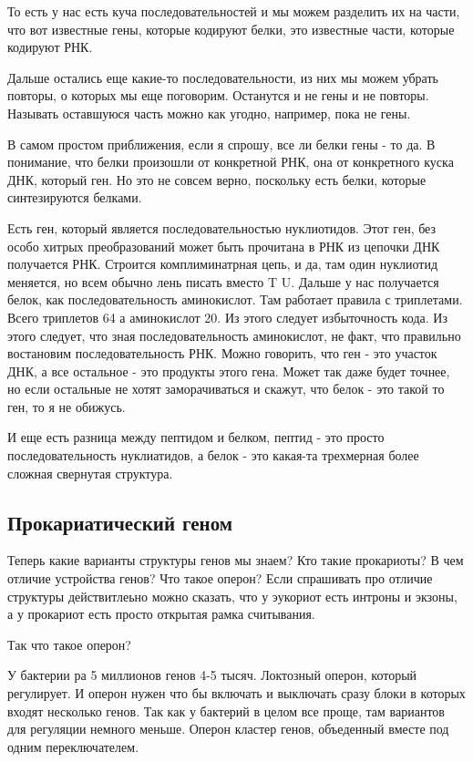 То есть у нас есть куча последовательностей и мы можем разделить их 
на части, что вот известные гены, которые кодируют белки, 
это известные части, которые кодируют РНК. 

Дальше остались еще какие-то последовательности, из 
них мы можем убрать повторы, о которых мы еще поговорим. Останутся и 
не гены и не повторы. Называть оставшуюся часть можно как угодно, 
например, пока не гены. 

В самом простом приближения, если я 
спрошу, все ли белки гены - то да. В понимание, что 
белки произошли от конкретной РНК, она от конкретного 
куска ДНК, который ген. Но это не совсем верно, 
поскольку есть белки, которые синтезируются белками. 

Есть ген, который является последовательностью нуклиотидов. 
Этот ген, без особо хитрых преобразований может быть прочитана 
в РНК из цепочки ДНК получается РНК. Строится комплиминатрная цепь, 
и да, там один нуклиотид меняется, но всем обычно лень писать 
вместо T U. Дальше у нас 
получается белок, как последовательность аминокислот. 
Там работает правила с триплетами. Всего 
триплетов 64 а аминокислот 20. Из этого 
следует избыточность кода. Из этого следует, что 
зная последовательность аминокислот, не факт, что правильно востановим 
последовательность РНК. Можно говорить, что ген - это участок ДНК,
а все остальное - это продукты этого гена. Может так даже будет точнее, 
но если остальные не хотят заморачиваться и скажут, что белок - это 
такой то ген, то я не обижусь. 

И еще есть разница между пептидом и белком, пептид - это просто 
последовательность нуклиатидов, а белок - это какая-та трехмерная 
более сложная свернутая структура. 

\subsection{Прокариатический геном}
Теперь какие варианты структуры генов мы знаем? 
Кто такие прокариоты? 
В чем отличие устройства генов? 
Что такое оперон? 
Если спрашивать про отличие структуры действитлеьно 
можно сказать, что у эукориот есть интроны и экзоны, 
а у прокариот есть просто 
открытая рамка считывания. 

Так что такое оперон? 

У бактерии ра 5 миллионов генов 4-5 тысяч. Локтозный оперон, 
который регулирует. И оперон нужен что бы включать и 
выключать сразу блоки в которых входят несколько генов. 
Так как у бактерий в целом все проще, там вариантов для регуляции немного 
меньше. Оперон кластер генов, объеденный вместе под одним переключателем. 


